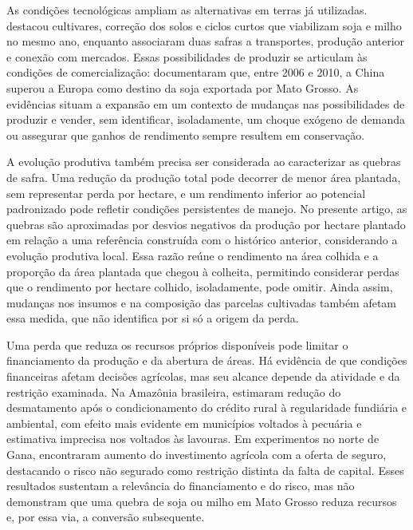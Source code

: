 As condições tecnológicas ampliam as alternativas em terras já utilizadas.  destacou cultivares, correção dos solos e ciclos curtos que viabilizam soja e milho no mesmo ano, enquanto  associaram duas safras a transportes, produção anterior e conexão com mercados. Essas possibilidades de produzir se articulam às condições de comercialização:  documentaram que, entre 2006 e 2010, a China superou a Europa como destino da soja exportada por Mato Grosso. As evidências situam a expansão em um contexto de mudanças nas possibilidades de produzir e vender, sem identificar, isoladamente, um choque exógeno de demanda ou assegurar que ganhos de rendimento sempre resultem em conservação.

A evolução produtiva também precisa ser considerada ao caracterizar as quebras de safra. Uma redução da produção total pode decorrer de menor área plantada, sem representar perda por hectare, e um rendimento inferior ao potencial padronizado pode refletir condições persistentes de manejo. No presente artigo, as quebras são aproximadas por desvios negativos da produção por hectare plantado em relação a uma referência construída com o histórico anterior, considerando a evolução produtiva local. Essa razão reúne o rendimento na área colhida e a proporção da área plantada que chegou à colheita, permitindo considerar perdas que o rendimento por hectare colhido, isoladamente, pode omitir. Ainda assim, mudanças nos insumos e na composição das parcelas cultivadas também afetam essa medida, que não identifica por si só a origem da perda.

Uma perda que reduza os recursos próprios disponíveis pode limitar o financiamento da produção e da abertura de áreas. Há evidência de que condições financeiras afetam decisões agrícolas, mas seu alcance depende da atividade e da restrição examinada. Na Amazônia brasileira,  estimaram redução do desmatamento após o condicionamento do crédito rural à regularidade fundiária e ambiental, com efeito mais evidente em municípios voltados à pecuária e estimativa imprecisa nos voltados às lavouras. Em experimentos no norte de Gana,  encontraram aumento do investimento agrícola com a oferta de seguro, destacando o risco não segurado como restrição distinta da falta de capital. Esses resultados sustentam a relevância do financiamento e do risco, mas não demonstram que uma quebra de soja ou milho em Mato Grosso reduza recursos e, por essa via, a conversão subsequente.

